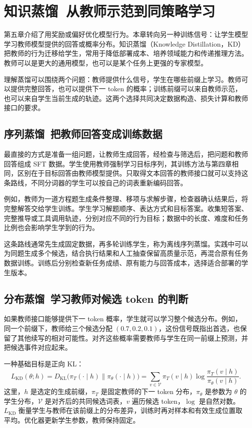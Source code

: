 \chapter{知识蒸馏~从教师示范到同策略学习}\label{知识蒸馏}

第五章介绍了用奖励或偏好优化模型行为。本章转向另一种训练信号：让学生模型学习教师模型提供的回答或概率分布。知识蒸馏（Knowledge Distillation，KD）把教师的行为迁移给学生，常用于降低部署成本、培养领域能力和传递推理方法。教师可以是更大的通用模型，也可以是某个任务上更强的专家模型。

理解蒸馏可以围绕两个问题：教师提供什么信号，学生在哪些前缀上学习。教师可以提供完整回答，也可以提供下一 token 的概率；训练前缀可以来自教师示范，也可以来自学生当前生成的轨迹。这两个选择共同决定数据构造、损失计算和教师接口的要求。

\section{序列蒸馏~把教师回答变成训练数据}\label{序列蒸馏}

最直接的方式是准备一组问题，让教师生成回答，经检查与筛选后，把问题和教师回答组成 SFT 数据。学生使用教师强制学习目标序列，其训练方法与第四章相同，区别在于目标回答由教师模型提供。只取得文本回答的教师接口就可以支持这条路线，不同分词器的学生可以按自己的词表重新编码回答。

例如，教师为一道方程题生成条件整理、移项与求解步骤，检查器确认结果后，将完整解答交给学生训练。学生学习解题顺序、表达方式和目标答案。收集短答案、完整推导或工具调用轨迹，分别对应不同的行为目标；数据中的长度、难度和任务比例也会影响学生学到的行为。

这条路线通常先生成固定数据，再多轮训练学生，称为离线序列蒸馏。实践中可以为同题生成多个候选，结合执行结果和人工抽查保留高质量示范，再混合原有任务数据训练。训练后分别检查新任务成绩、原有能力与回答成本，选择适合部署的学生版本。

\section{分布蒸馏~学习教师对候选 token 的判断}\label{分布蒸馏}

如果教师接口能够提供下一 token 概率，学生就可以学习整个候选分布。例如，同一个前缀下，教师给三个候选分配 $(0.7,0.2,0.1)$，这份信号既指出首选，也保留了其他续写的相对可能性。对齐这些概率需要教师与学生在同一前缀上预测，并把候选事件对应起来。

一种基础目标是正向 KL：
\[
L_{\mathrm{KD}}(\theta;h)=
D_{\mathrm{KL}}\bigl(\pi_T(\cdot\mid h)\|\pi_\theta(\cdot\mid h)\bigr)
=\sum_{v\in\mathcal V}\pi_T(v\mid h)
\log\frac{\pi_T(v\mid h)}{\pi_\theta(v\mid h)}.
\]
这里，$h$ 是选定的生成前缀，$\pi_T$ 是固定教师的下一 token 分布，$\pi_\theta$ 是参数为 $\theta$ 的学生分布，$\mathcal V$ 是对齐后的共同候选词表，$v$ 遍历候选 token，$\log$ 是自然对数。$L_{\mathrm{KD}}$ 衡量学生与教师在该前缀上的分布差异，训练时再对样本和有效生成位置取平均。优化器更新学生参数，教师保持固定。

